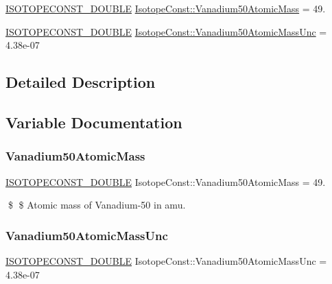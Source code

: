 \begin{DoxyCompactItemize}
\item 
\mbox{\hyperlink{group___isotope_const-_macros_ga8f45a7272ce02c0b4c65c44636ed719a}{I\+S\+O\+T\+O\+P\+E\+C\+O\+N\+S\+T\+\_\+\+D\+O\+U\+B\+LE}} \mbox{\hyperlink{group___isotope_const-_vanadium-_v50_ga02ed3f0e4270663d5ad97c305d6b1717}{Isotope\+Const\+::\+Vanadium50\+Atomic\+Mass}} = 49.
\item 
\mbox{\hyperlink{group___isotope_const-_macros_ga8f45a7272ce02c0b4c65c44636ed719a}{I\+S\+O\+T\+O\+P\+E\+C\+O\+N\+S\+T\+\_\+\+D\+O\+U\+B\+LE}} \mbox{\hyperlink{group___isotope_const-_vanadium-_v50_ga1785adbbe1de2ac304b2e3041b0a2c05}{Isotope\+Const\+::\+Vanadium50\+Atomic\+Mass\+Unc}} = 4.\+38e-\/07
\end{DoxyCompactItemize}


\subsection{Detailed Description}


\subsection{Variable Documentation}
\mbox{\label{group___isotope_const-_vanadium-_v50_ga02ed3f0e4270663d5ad97c305d6b1717}} 
\subsubsection{\texorpdfstring{Vanadium50\+Atomic\+Mass}{Vanadium50AtomicMass}}
{\footnotesize\ttfamily \mbox{\hyperlink{group___isotope_const-_macros_ga8f45a7272ce02c0b4c65c44636ed719a}{I\+S\+O\+T\+O\+P\+E\+C\+O\+N\+S\+T\+\_\+\+D\+O\+U\+B\+LE}} Isotope\+Const\+::\+Vanadium50\+Atomic\+Mass = 49.}

\$ \$ Atomic mass of Vanadium-\/50 in amu. \mbox{\label{group___isotope_const-_vanadium-_v50_ga1785adbbe1de2ac304b2e3041b0a2c05}} 
\subsubsection{\texorpdfstring{Vanadium50\+Atomic\+Mass\+Unc}{Vanadium50AtomicMassUnc}}
{\footnotesize\ttfamily \mbox{\hyperlink{group___isotope_const-_macros_ga8f45a7272ce02c0b4c65c44636ed719a}{I\+S\+O\+T\+O\+P\+E\+C\+O\+N\+S\+T\+\_\+\+D\+O\+U\+B\+LE}} Isotope\+Const\+::\+Vanadium50\+Atomic\+Mass\+Unc = 4.\+38e-\/07}

